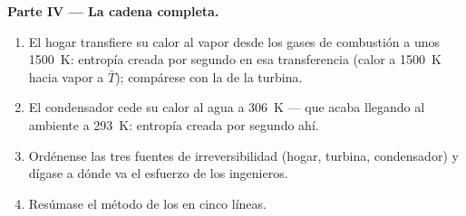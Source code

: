\begin{problem}
\textbf{Parte IV --- La cadena completa.}
\begin{enumerate}[resume]
  \item El hogar transfiere su calor al vapor desde los gases de combustión a
        unos \qty{1500}{K}: entropía creada por segundo en esa transferencia
        (calor a \qty{1500}{K} hacia vapor a $\bar T$); compárese con la
        de la turbina.
  \item El condensador cede su calor al agua a \qty{306}{K} ---
        que acaba llegando al ambiente a \qty{293}{K}: entropía
        creada por segundo ahí.
  \item Ordénense las tres fuentes de irreversibilidad (hogar, turbina,
        condensador) y dígase a dónde va el esfuerzo de los ingenieros.
  \item Resúmase el método de los  en cinco líneas.
\end{enumerate}
\end{problem}
